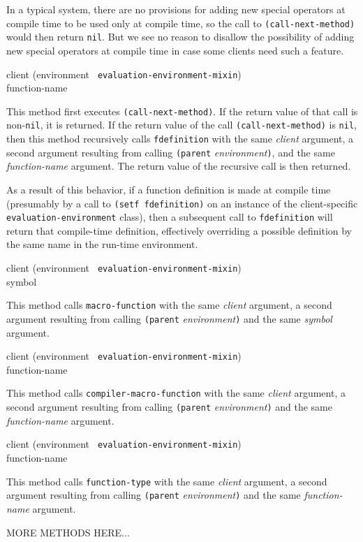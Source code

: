 In a typical system, there are no provisions for adding new special
operators at compile time to be used only at compile time, so the call
to \texttt{(call-next-method)} would then return \texttt{nil}.  But we
see no reason to disallow the possibility of adding new special
operators at compile time in case some clients need such a feature.

{\small{} {client (environment {\tt
      evaluation-environment-mixin}) \\ function-name}
}

This method first executes \texttt{(call-next-method)}.  If the return
value of that call is non-\texttt{nil}, it is returned.  If the return
value of the call \texttt{(call-next-method)} is \texttt{nil}, then
this method recursively calls \texttt{fdefinition} with the same
\textit{client} argument, a second argument resulting from calling
\texttt{(parent} \textit{environment}\texttt{)}, and the same
\textit{function-name} argument.  The return value of the recursive
call is then returned.

As a result of this behavior, if a function definition is made at
compile time (presumably by a call to \texttt{(setf fdefinition)} on
an instance of the client-specific \texttt{evaluation-environment}
class), then a subsequent call to \texttt{fdefinition} will return
that compile-time definition, effectively overriding a possible
definition by the same name in the run-time environment.

{\small{} {client (environment {\tt
      evaluation-environment-mixin}) \\ symbol}
}

This method calls \texttt{macro-function} with the same
\textit{client} argument, a second argument resulting from calling
\texttt{(parent} \textit{environment}\texttt{)} and the same
\textit{symbol} argument.

{\small{} {client (environment {\tt
      evaluation-environment-mixin}) \\ function-name}
}

This method calls \texttt{compiler-macro-function} with the same
\textit{client} argument, a second argument resulting from calling
\texttt{(parent} \textit{environment}\texttt{)} and the same
  \textit{function-name} argument.

{\small{} {client (environment {\tt
      evaluation-environment-mixin}) \\ function-name}
}

This method calls \texttt{function-type} with the same \textit{client}
argument, a second argument resulting from calling \texttt{(parent}
\textit{environment}\texttt{)} and the same \textit{function-name}
argument.

MORE METHODS HERE...

